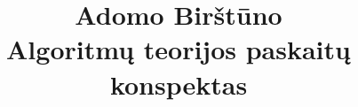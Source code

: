 \documentclass{report}
\title{%
Adomo Birštūno\\
Algoritmų teorijos paskaitų konspektas}
\author{}
\theoremstyle{plain}
\theoremstyle{definition}
\theoremstyle{remark}
\theoremstyle{notation}
\begin{document}


%
%
%
%
%
%
%
%


\maketitle
\bigskip
\tableofcontents

\end{document}
